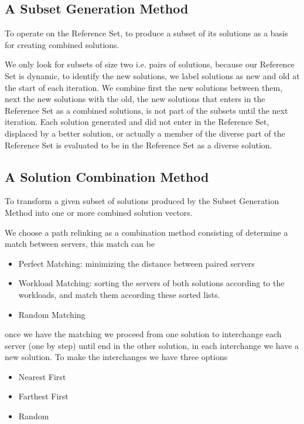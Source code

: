 \subsection{A Subset Generation Method}
To operate on the Reference Set,
to produce a subset of its solutions
as a basis for creating combined solutions.

We only look for subsets of size two
i.e. pairs of solutions,
because our Reference Set is dynamic,
to identify the new solutions,
we label solutions as new and old
at the start of each iteration.
We combine first the new solutions
between them,
next the new solutions with the old,
the new solutions that enters in the Reference Set
as a combined solutions,
is not part of the subsets
until the next iteration.
Each solution generated
and did not enter in the Reference Set,
displaced by a better solution,
or actually
a member of the diverse part of the Reference Set
is evaluated to be in the Reference Set
as a diverse solution.

\subsection{A Solution Combination Method}
To transform a given subset of solutions 
produced by the Subset Generation Method
into
one or more combined solution vectors.

We choose a path relinking as a combination method
consisting of
determine a match between servers,
this match can be
\begin{itemize}
\item Perfect Matching:
  minimizing the distance between paired servers
\item Workload Matching:
  sorting the servers of both solutions
  according to the workloads,
  and match them according these sorted lists.
\item Random Matching
\end{itemize}
once we have the matching
we proceed from one solution
to interchange each server
(one by step)
until end in the other solution,
in each interchange
we have a new solution.
To make the interchanges
we have three options
\begin{itemize}
\item Nearest First
\item Farthest First
\item Random
\end{itemize}


